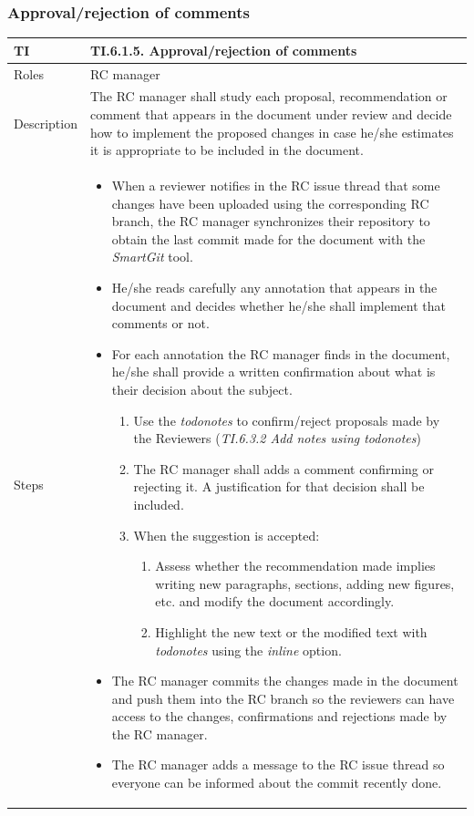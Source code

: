 \documentclass{template/openetcs_article}
\begin{document}
\subsubsection{Approval/rejection of comments}

\begin{flushleft}
\tablefirsthead{}
\tablehead{}
\tabletail{}
\tablelasttail{}
\begin{supertabular}{|m{2cm}|m{13cm}|}
\hline
{}
TI & 
TI.6.1.5. Approval/rejection of comments
\\\hline
Roles &
RC manager
\\\hline
Description &
The RC manager shall study each proposal, recommendation or comment that appears in the document under review and decide how to implement the proposed changes in case he/she estimates it is appropriate to be included in the document.  
\\\hline
Steps &
\begin{itemize}
\item When a reviewer notifies in the RC issue thread that some changes have been uploaded using the corresponding RC branch, the RC manager synchronizes their repository to obtain the last commit made for the document with the {\it SmartGit} tool.
\item He/she reads carefully any annotation that appears in the document and decides whether he/she shall implement that comments or not.
\item For each annotation the RC manager finds in the document, he/she shall provide a written confirmation about what is their decision about the subject. 
\begin{enumerate}
\item Use the {\it todonotes} to confirm/reject proposals made by the Reviewers ({\it TI.6.3.2 Add notes using todonotes}) 
\item The RC manager shall adds a comment confirming or rejecting it. A justification for that decision shall be included.
\item When the suggestion is accepted:
\begin{enumerate}
\item Assess whether the recommendation made implies writing new paragraphs, sections, adding new figures, etc. and modify the document accordingly. 
\item Highlight the new text or the modified text with {\it todonotes} using the {\it inline} option.
\end{enumerate}
\end{enumerate}
\item The RC manager commits the changes made in the document and push them into the RC branch so the reviewers can have access to the changes, confirmations and rejections made by the RC manager.
\item The RC manager adds a message to the RC issue thread so everyone can be informed about the commit recently done. 
\end{itemize}
\\\hline
\end{supertabular}
\end{flushleft}
\end{document}
